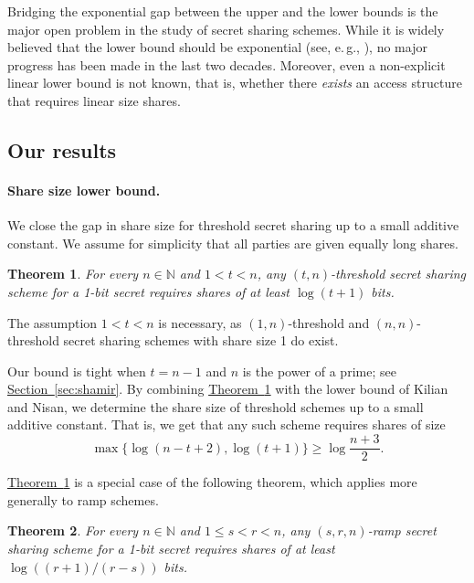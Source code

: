 \documentclass[11pt]{article}
\numberwithin{equation}{section}
\newtheorem{theorem}{Theorem}[section]
\theoremstyle{definition}
\theoremstyle{plain}
\newcommand{\eg}{e.\,g.}
\newcommand{\expref}[2]{\hyperref[#2]{#1~\ref{#2}}}
\begin{document}
Bridging the exponential gap between
%
the upper and the lower bounds  %
is the major open
%
problem  %
in the study of secret sharing schemes. While it is widely believed
that the lower bound should be exponential 
(see, \eg, \cite{BeimelPHD,Beimel11}), no major progress has been
%
made  %
in the last two decades. Moreover, even a 
non-explicit linear lower bound is not known, that is, whether there
\emph{exists} an access structure that requires linear size shares.

\subsection{Our results}

\paragraph{Share size lower bound.} We close the gap in share size for threshold
secret sharing up to a small additive constant.  We assume for simplicity that
all parties are given equally long shares.

\begin{theorem}	\label{cor:main}
For every $n\in\mathbb{N}$ and $1 < t < n$, any $(t,n)$-threshold secret 
sharing scheme for a
1-bit secret requires shares of at least $\log (t+1)$ bits.
\end{theorem}

The assumption $1 < t < n$ is necessary, as $(1, n)$-threshold and $(n, n)$-threshold secret sharing schemes with share size 1 do exist.

Our bound is tight when $t = n - 1$ and $n$ is the power of a prime; see
\expref{Section}{sec:shamir}. By combining \expref{Theorem}{cor:main} with the lower
bound of Kilian and Nisan, we determine the share size of threshold schemes up
to a small additive constant.  That is, we get that any such scheme requires
shares of size
\begin{equation}
\label{eqn:combined}
\max\{\log(n-t+2), \log (t+1)\} \geq \log \frac{n+3}{2}.
\end{equation}

\expref{Theorem}{cor:main} is a special case of the following theorem, which applies more generally to ramp schemes. 

\begin{theorem}
	\label{thm:main}
	For every $n\in\mathbb{N}$ and $1 \leq s < r < n$, any $(s,r,n)$-ramp secret sharing scheme
	for a 1-bit secret requires shares of at least $\log ((r + 1)/(r-s))$ bits.
\end{theorem}
\end{document}
